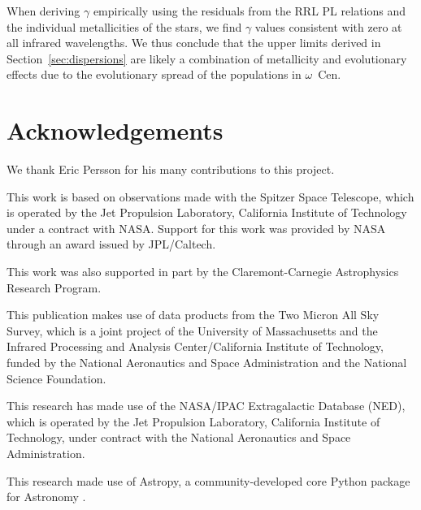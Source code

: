 \documentclass[a4paper,fleqn,usenatbib]{mnras}
\newcommand{\ocen}{$\omega$~Cen\xspace}
\begin{document}
When deriving $\gamma$ empirically using the residuals from the RRL PL relations and the individual metallicities of the stars, we find $\gamma$ values consistent with zero at all infrared wavelengths. We thus conclude that the upper limits derived in Section~\ref{sec:dispersions} are likely a combination of metallicity and evolutionary effects due to the evolutionary spread of the populations in \ocen.  


\section*{Acknowledgements}
\label{sec:acknowledgements}

We thank Eric Persson for his many contributions to this project.

This work is based on observations made with the Spitzer Space Telescope, which is operated by the Jet Propulsion Laboratory, California Institute of Technology under a contract with NASA. Support for this work was provided by NASA through an award issued by JPL/Caltech.

This work was also supported in part by the Claremont-Carnegie Astrophysics Research Program.

This publication makes use of data products from the Two Micron All Sky Survey, which is a joint project of the University of Massachusetts and the Infrared Processing and Analysis Center/California Institute of Technology, funded by the National Aeronautics and Space Administration and the National Science Foundation.

This research has made use of the NASA/IPAC Extragalactic Database (NED), which is operated by the Jet Propulsion Laboratory, California Institute of Technology, under contract with the National Aeronautics and Space Administration.

This research made use of Astropy, a community-developed core Python package for Astronomy \citep{2013A&A...558A..33A}.


\end{document}
